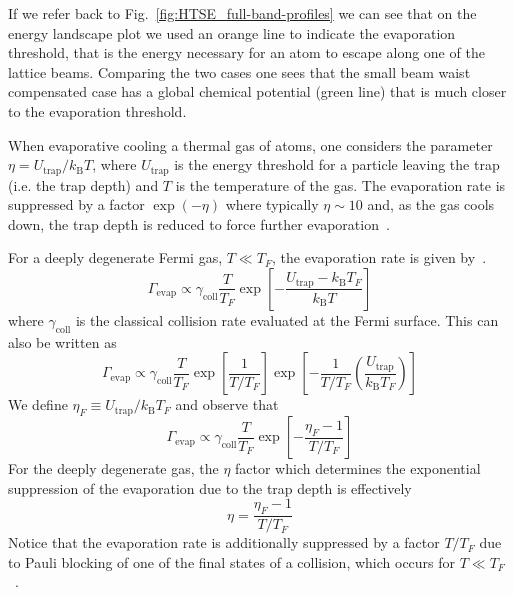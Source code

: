 \documentclass[11pt,letter]{article}
\newcommand{\kb}{\ensuremath{k_{\text{B}}}}
\begin{document}
If we refer back to Fig.~\ref{fig:HTSE_full-band-profiles}  we can see that on
the energy landscape plot we used an orange line to indicate the evaporation
threshold, that is the energy necessary for an atom to escape along one of the
lattice beams.  Comparing the two cases one sees that the small beam waist
compensated case has a global chemical potential (green line) that is much
closer to the evaporation threshold.

When evaporative cooling a thermal gas of atoms, one considers the parameter
$\eta=U_{\text{trap}}/\kb T$, where $U_{\text{trap}}$ is the energy threshold
for a particle leaving the trap (i.e. the trap depth) and $T$ is the
temperature of the gas.   The evaporation rate is suppressed by a factor
$\exp(-\eta)$ where  typically $\eta\sim10$ and, as the gas cools down, the trap
depth is reduced to force further evaporation~\cite{OHara2001}.  

For a deeply degenerate Fermi gas,  $T \ll T_{F}$, the evaporation rate is
given by~\cite{OHara2001}.
\begin{equation}
  \Gamma_{\text{evap}} \propto \gamma_{\text{coll}} \frac{T}{T_{F}} 
  \exp\left[ -   
  \frac{ U_{\text{trap}} - \kb T_{F} }{ \kb T }  \right ] 
\end{equation}
where $\gamma_{\text{coll}}$ is the classical collision rate evaluated at the
Fermi surface.  This can also be written as 
\begin{equation}
  \Gamma_{\text{evap}} \propto \gamma_{\text{coll}} \frac{T}{T_{F}}
  \exp\left[ \frac{1}{T/T_{F}} \right]  
  \exp\left[ -  \frac{1}{T/T_{F}} \left( \frac{U_{\text{trap}}}{\kb T_{F}} \right) \right] 
\end{equation}
We define $ \eta_{F} \equiv U_{\text{trap}}/\kb T_{F}$ and observe that 
\begin{equation}
  \Gamma_{\text{evap}} \propto \gamma_{\text{coll}} \frac{T}{T_{F}}
  \exp\left[ -  \frac{\eta_{F} - 1 }{ T/T_{F} } \right]
\label{eq:etaF}
\end{equation}
For the deeply degenerate gas, the $\eta$ factor which determines the
exponential suppression of the evaporation due to the trap depth is effectively
\begin{equation}
 \eta = \frac{\eta_{F} - 1 }{T/T_{F} } 
\end{equation}
Notice that the evaporation rate is additionally suppressed by a factor
$T/T_{F}$ due to Pauli blocking of one of the final states of a collision, which
occurs for $T\ll T_{F}$~\cite{OHara2001}.
\end{document}
